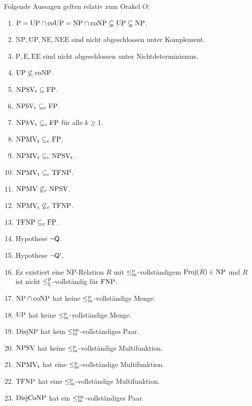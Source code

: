 \begin{corollary}
    Folgende Aussagen gelten relativ zum Orakel $O$:
    \begin{enumerate}[noitemsep,midpenalty=0]\raggedright
        \item $\mathrm{P}=\mathrm{UP}\cap\mathrm{coUP}=\mathrm{NP}\cap\mathrm{coNP}\subsetneq \mathrm{UP} \subsetneq \mathrm{NP}$.
        \item $\mathrm{NP, UP, NE, NEE}$ sind nicht abgeschlossen unter Komplement. 
        \item $\mathrm{P, E, EE}$ sind nicht abgeschlossen unter Nichtdeterminismus.
        \item $\mathrm{UP}\not\subseteq \mathrm{coNP}$.
        \item $\mathrm{NPSV_t}\subseteq\mathrm{FP}$.
        \item $\mathrm{NP}b\mathrm{V_t} \subseteq_{\mathrm{c}}\mathrm{FP}$.
        \item $\mathrm{NP}k\mathrm{V_t} \subseteq_{\mathrm{c}}\mathrm{FP}$ für alle $k\geq 1$.
        \item $\mathrm{NPMV_t} \subseteq_{\mathrm{c}} \mathrm{FP}$.
        \item $\mathrm{NPMV_t} \subseteq_{\mathrm{c}} \mathrm{NPSV_t}$.
        \item $\mathrm{NPMV_t} \subseteq_{\mathrm{c}} \mathrm{TFNP}$.
        \item $\mathrm{NPMV} \not\subseteq_{\mathrm{c}} \mathrm{NPSV}$.
        \item $\mathrm{NPMV_t} \not\subseteq_{\mathrm{c}} \mathrm{TFNP}$.
        \item $\mathrm{TFNP}\subseteq_{\mathrm{c}} \mathrm{FP}$.
        \item Hypothese $\neg\mathsf{Q}$.
        \item Hypothese $\neg\mathsf{Q}'$.
        \item Es existiert eine NP-Relation $R$ mit $\leq_\mathrm{m}^\mathrm{p}$-vollständigem $\operatorname{Proj}(R)\in\mathrm{NP}$ und $R$ ist nicht $\leq_\mathrm{L}^\mathrm{p}$-vollständig für $\mathrm{FNP}$.
        \item $\mathrm{NP}\cap\mathrm{coNP}$ hat keine $\leq_\mathrm{m}^\mathrm{p}$-vollständige Menge.
        \item $\mathrm{UP}$ hat keine $\leq_\mathrm{m}^\mathrm{p}$-vollständige Menge.
        \item $\mathrm{DisjNP}$ hat kein $\leq_\mathrm{m}^\mathrm{pp}$-vollständiges Paar.
        \item $\mathrm{NPSV}$ hat keine $\leq_\mathrm{m}^\mathrm{p}$-vollständige Multifunktion.
        \item $\mathrm{NPMV_t}$ hat eine $\leq_\mathrm{m}^\mathrm{p}$-vollständige Multifunktion.
        \item $\mathrm{TFNP}$ hat eine $\leq_\mathrm{m}^\mathrm{p}$-vollständige Multifunktion.
        \item $\mathrm{DisjCoNP}$ hat ein $\leq_\mathrm{m}^\mathrm{pp}$-vollständiges Paar.

\end{enumerate}
\end{corollary}
